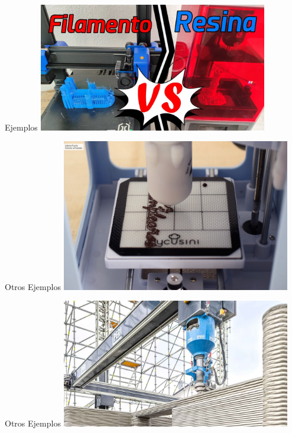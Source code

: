 \documentclass{beamer}
\begin{document}
\begin{frame}{Ejemplos}
\centering
\includegraphics[width=10cm]{maxresdefault.png}
\end{frame}
\begin{frame}{Otros Ejemplos}
    \centering
\includegraphics[width=10cm]{1366_2000.png}
\end{frame}
\begin{frame}{Otros Ejemplos}
    \centering
\includegraphics[width=10cm]{tecnologia-impresion_3d-tecnologia_538707966_165982583_1706x960.jpg}
\end{frame}
\end{document}
